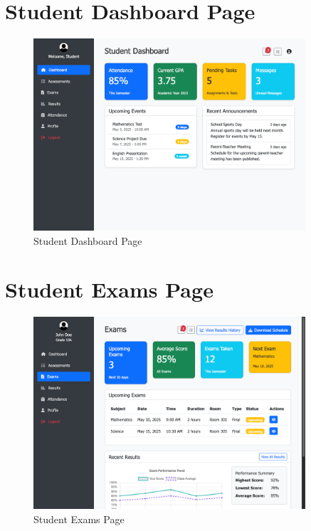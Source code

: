 \documentclass[12pt,a4paper]{report}
\begin{document}
\section{Student Dashboard Page}
\begin{figure}[htbp]
    \centering
    \includegraphics[width=0.9\textwidth]{student-dashboard-page.png}
    \caption{Student Dashboard Page}
    \label{fig:student-dashboard-page}
\end{figure}

\section{Student Exams Page}
\begin{figure}[htbp]
    \centering
    \includegraphics[width=0.9\textwidth]{student-exams-page.png}
    \caption{Student Exams Page}
    \label{fig:student-exams-page}
\end{figure}
\end{document}
